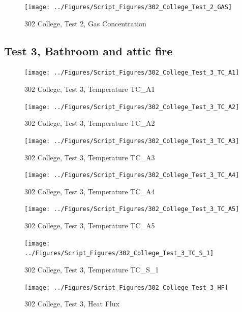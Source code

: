 \documentclass[12pt,oneside]{book}
\begin{document}
\begin{figure}[!ht]
\texttt{[image: ../Figures/Script\_Figures/302\_College\_Test\_2\_GAS]}
\caption{302 College, Test 2, Gas Concentration}
\label{fig:302_College_Test_2_GAS}
\end{figure}


\clearpage


\subsection{Test 3, Bathroom and attic fire}

\begin{figure}[!ht]
\texttt{[image: ../Figures/Script\_Figures/302\_College\_Test\_3\_TC\_A1]}
\caption{302 College, Test 3, Temperature TC\_A1}
\label{fig:302_College_Test_3_TC_A1}
\end{figure}

\begin{figure}[!ht]
\texttt{[image: ../Figures/Script\_Figures/302\_College\_Test\_3\_TC\_A2]}
\caption{302 College, Test 3, Temperature TC\_A2}
\label{fig:302_College_Test_3_TC_A2}
\end{figure}

\begin{figure}[!ht]
\texttt{[image: ../Figures/Script\_Figures/302\_College\_Test\_3\_TC\_A3]}
\caption{302 College, Test 3, Temperature TC\_A3}
\label{fig:302_College_Test_3_TC_A3}
\end{figure}

\begin{figure}[!ht]
\texttt{[image: ../Figures/Script\_Figures/302\_College\_Test\_3\_TC\_A4]}
\caption{302 College, Test 3, Temperature TC\_A4}
\label{fig:302_College_Test_3_TC_A4}
\end{figure}

\begin{figure}[!ht]
\texttt{[image: ../Figures/Script\_Figures/302\_College\_Test\_3\_TC\_A5]}
\caption{302 College, Test 3, Temperature TC\_A5}
\label{fig:302_College_Test_3_TC_A5}
\end{figure}

\begin{figure}[!ht]
\texttt{[image: ../Figures/Script\_Figures/302\_College\_Test\_3\_TC\_S\_1]}
\caption{302 College, Test 3, Temperature TC\_S\_1}
\label{fig:302_College_Test_3_TC_S_1}
\end{figure}

\begin{figure}[!ht]
\texttt{[image: ../Figures/Script\_Figures/302\_College\_Test\_3\_HF]}
\caption{302 College, Test 3, Heat Flux}
\label{fig:302_College_Test_3_HF}
\end{figure}
\end{document}
